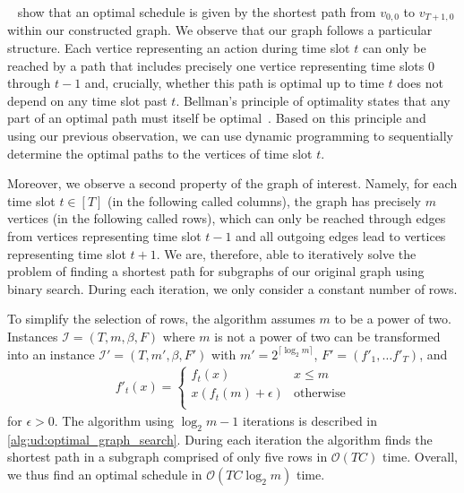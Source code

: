 \citeauthor*{Albers2018}~\cite{Albers2018} show that an optimal schedule is given by the shortest path from $v_{0,0}$ to $v_{T+1,0}$ within our constructed graph. We observe that our graph follows a particular structure. Each vertice representing an action during time slot $t$ can only be reached by a path that includes precisely one vertice representing time slots $0$ through $t - 1$ and, crucially, whether this path is optimal up to time $t$ does not depend on any time slot past $t$. Bellman's principle of optimality states that any part of an optimal path must itself be optimal~\cite{Bellman1954}. Based on this principle and using our previous observation, we can use dynamic programming to sequentially determine the optimal paths to the vertices of time slot $t$.

Moreover, we observe a second property of the graph of interest. Namely, for each time slot $t \in [T]$ (in the following called columns), the graph has precisely $m$ vertices (in the following called rows), which can only be reached through edges from vertices representing time slot $t - 1$ and all outgoing edges lead to vertices representing time slot $t + 1$. We are, therefore, able to iteratively solve the problem of finding a shortest path for subgraphs of our original graph using binary search. During each iteration, we only consider a constant number of rows.

To simplify the selection of rows, the algorithm assumes $m$ to be a power of two. Instances $\mathcal{I} = (T, m, \beta, F)$ where $m$ is not a power of two can be transformed into an instance $\mathcal{I}' = (T, m', \beta, F')$ with $m' = 2^{\lceil \log_2 m \rceil}$, $F' = (f'_1, \dots f'_T)$, and \begin{align*}
    f'_t(x) = \begin{cases}
        f_t(x) & x \leq m \\
        x (f_t(m) + \epsilon) & \text{otherwise} \\
    \end{cases}
\end{align*} for $\epsilon > 0$. The algorithm using $\log_2 m - 1$ iterations is described in \cref{alg:ud:optimal_graph_search}. During each iteration the algorithm finds the shortest path in a subgraph comprised of only five rows in $\mathcal{O}(T C)$ time. Overall, we thus find an optimal schedule in $\mathcal{O}(T C \log_2 m)$ time.

